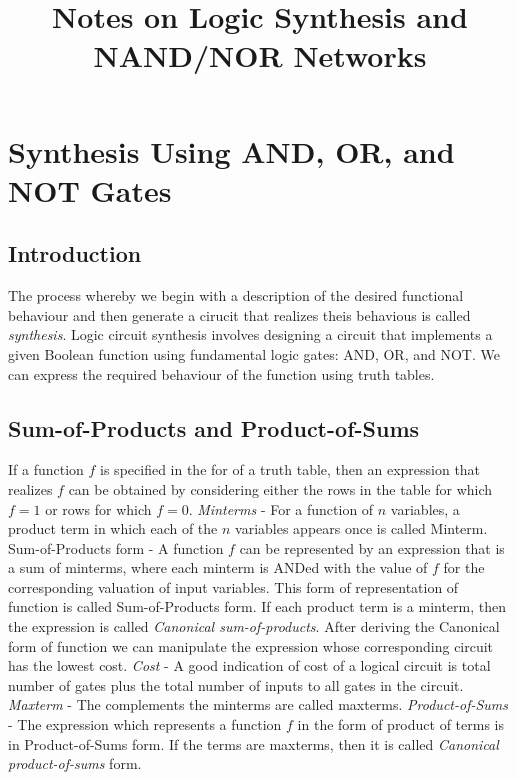 \documentclass{article}
\title{Notes on Logic Synthesis and NAND/NOR Networks}
\date{}
\begin{document}
\maketitle

\section{Synthesis Using AND, OR, and NOT Gates}

\subsection{Introduction}
The process whereby we begin with a description of the desired functional behaviour and then generate a cirucit that realizes theis behavious is called \textit{synthesis}. Logic circuit synthesis involves designing a circuit that implements a given Boolean function using fundamental logic gates: AND, OR, and NOT. We can express the required behaviour of the function using truth tables. 

\subsection{Sum-of-Products and Product-of-Sums}
If a function $f$ is specified in the for of a truth table, then an expression that realizes $f$ can be obtained by considering either the rows in the table for which $f=1$ or rows for which $f=0$.\newline\newline
\textit{Minterms} - For a function of $n$ variables, a product term in which each of the $n$ variables appears once is called Minterm.\newline\newline
Sum-of-Products form - A function $f$ can be represented by an expression that is a sum of minterms, where each minterm is ANDed with the value of $f$ for the corresponding valuation of input variables. This form of representation of function is called Sum-of-Products form. If each product term is a minterm, then the expression is called \textit{Canonical sum-of-products}. After deriving the Canonical form of function we can manipulate the expression whose corresponding circuit has the lowest cost.\newline\newline
\textit{Cost} - A good indication of cost of a logical circuit is total number of gates plus the total number of inputs to all gates in the circuit.\newline\newline
\textit{Maxterm} - The complements the minterms are called maxterms.\newline\newline
\textit{Product-of-Sums} - The expression which represents a function $f$ in the form of product of terms is in Product-of-Sums form. If the terms are maxterms, then it is called \textit{Canonical product-of-sums} form.\newline\newline
\end{document}
